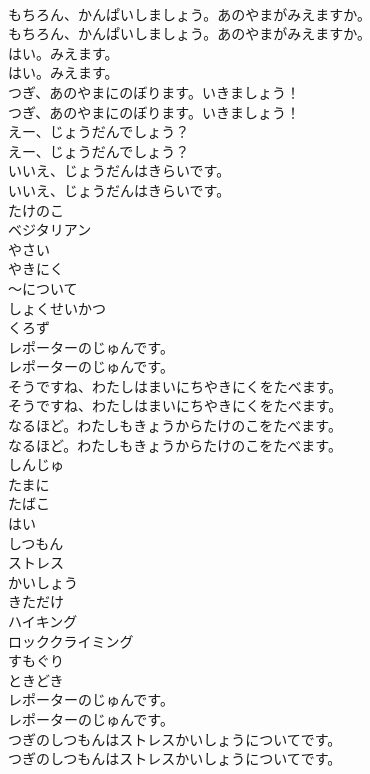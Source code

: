\documentclass[8pt]{extreport}
\begin{document}
\begin{CJK}{UTF8}{min}
\\	もちろん、かんぱいしましょう。あのやまがみえますか。	
\\	もちろん、かんぱいしましょう。あのやまがみえますか。 
\\	はい。みえます。	
\\	はい。みえます。 
\\	つぎ、あのやまにのぼります。いきましょう！	
\\	つぎ、あのやまにのぼります。いきましょう！ 
\\	えー、じょうだんでしょう？	
\\	えー、じょうだんでしょう？ 
\\	いいえ、じょうだんはきらいです。	
\\	いいえ、じょうだんはきらいです。 
\\	たけのこ
\\	ベジタリアン
\\	やさい
\\	やきにく
\\	～について
\\	しょくせいかつ
\\	くろず
\\	レポーターのじゅんです。	
\\	レポーターのじゅんです。 
\\	そうですね、わたしはまいにちやきにくをたべます。	
\\	そうですね、わたしはまいにちやきにくをたべます。 
\\	なるほど。わたしもきょうからたけのこをたべます。	
\\	なるほど。わたしもきょうからたけのこをたべます。 
\\	しんじゅ
\\	たまに
\\	たばこ
\\	はい
\\	しつもん
\\	ストレス
\\	かいしょう
\\	きただけ
\\	ハイキング
\\	ロッククライミング
\\	すもぐり
\\	ときどき
\\	レポーターのじゅんです。	
\\	レポーターのじゅんです。 
\\	つぎのしつもんはストレスかいしょうについてです。	
\\	つぎのしつもんはストレスかいしょうについてです。 

\end{CJK}
\end{document}
